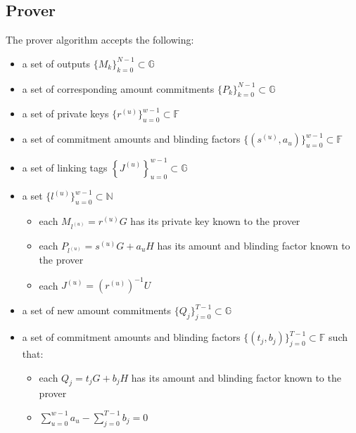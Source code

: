 \documentclass[draft]{article} %
\newcommand{\G}{\mathbb{G}}
\newcommand{\F}{\mathbb{F}}
\newcommand{\N}{\mathbb{N}}
\begin{document}
\subsection{Prover}
The prover algorithm accepts the following:
\begin{itemize}
\item a set of outputs $\{M_k\}_{k=0}^{N-1} \subset \G$
\item a set of corresponding amount commitments $\{P_k\}_{k=0}^{N-1} \subset \G$
\item a set of private keys $\{r^{(u)}\}_{u=0}^{w-1} \subset \F$
\item a set of commitment amounts and blinding factors $\{(s^{(u)},a_u)\}_{u=0}^{w-1} \subset \F$
\item a set of linking tags $\left\{J^{(u)}\right\}_{u=0}^{w-1} \subset \G$
\item a set $\{l^{(u)}\}_{u=0}^{w-1} \subset \N$
\begin{itemize}
\item each $M_{l^{(u)}} = r^{(u)}G$ has its private key known to the prover
\item each $P_{l^{(u)}} = s^{(u)}G + a_uH$ has its amount and blinding factor known to the prover
\item each $J^{(u)} = (r^{(u)})^{-1}U$
\end{itemize}
\item a set of new amount commitments $\{Q_j\}_{j=0}^{T-1} \subset \G$
\item a set of commitment amounts and blinding factors $\{(t_j,b_j)\}_{j=0}^{T-1} \subset \F$ such that:
\begin{itemize}
\item each $Q_j = t_jG + b_jH$ has its amount and blinding factor known to the prover
\item $\sum_{u=0}^{w-1} a_u - \sum_{j=0}^{T-1} b_j = 0$
\end{itemize}
\end{itemize}
\end{document}
